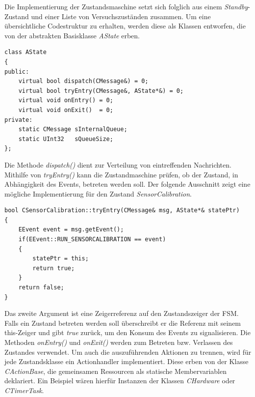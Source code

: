 Die Implementierung der Zustandsmaschine setzt sich folglich aus einem \textit{Standby}-Zustand und einer Liste von Versuchszuständen zusammen. Um eine übersichtliche Codestruktur zu erhalten, werden diese als Klassen entworfen, die von der abstrakten Basisklasse \textit{AState} erben.
\begin{lstlisting}[caption={Angepasste Implementierung der abstrakten Zustandsklasse},captionpos=b]
class AState
{
public:
	virtual bool dispatch(CMessage&) = 0;
	virtual bool tryEntry(CMessage&, AState*&) = 0;
	virtual void onEntry() = 0;
	virtual void onExit()  = 0;
private:
	static CMessage sInternalQueue;
	static UInt32   sQueueSize;
};
\end{lstlisting}
Die Methode \textit{dispatch()} dient zur Verteilung von eintreffenden Nachrichten. Mithilfe von \textit{tryEntry()} kann die Zustandmaschine prüfen, ob der Zustand, in Abhängigkeit des Events, betreten werden soll. Der folgende Ausschnitt zeigt eine mögliche Implementierung für den Zustand \textit{SensorCalibration}.
\begin{lstlisting}[caption={Beispielhafte Definition der Methode \textit{tryEntry()}},captionpos=b]
bool CSensorCalibration::tryEntry(CMessage& msg, AState*& statePtr)
{
	EEvent event = msg.getEvent();
	if(EEvent::RUN_SENSORCALIBRATION == event)
	{
		statePtr = this;
		return true;
	}
	return false;
}
\end{lstlisting}
Das zweite Argument ist eine Zeigerreferenz auf den Zustandszeiger der FSM. Falls ein Zustand betreten werden soll überschreibt er die Referenz mit seinem this-Zeiger und gibt \textit{true} zurück, um den Konsum des Events zu signalisieren. Die Methoden \textit{onEntry()} und \textit{onExit()} werden zum Betreten bzw. Verlassen des Zustandes verwendet. Um auch die auszuführenden Aktionen zu trennen, wird für jede Zustandsklasse ein Actionhandler implementiert. Diese erben von der Klasse \textit{CActionBase}, die gemeinsamen Ressourcen als statische Membervariablen deklariert. Ein Beispiel wären hierfür Instanzen der Klassen \textit{CHardware} oder \textit{CTimerTask}.

